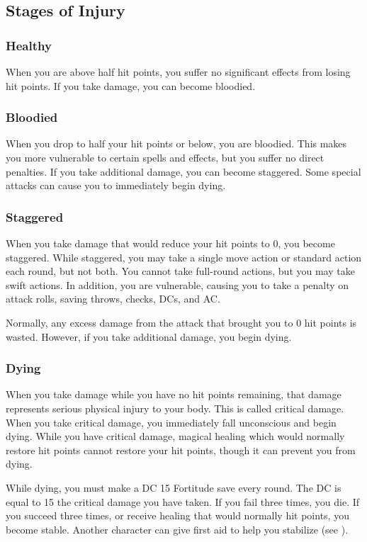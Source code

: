 \subsection{Stages of Injury}

\subsubsection{Healthy} 
When you are above half hit points, you suffer no significant effects from losing hit points. If you take damage, you can become bloodied.

\subsubsection{Bloodied}
When you drop to half your hit points or below, you are bloodied. This makes you more vulnerable to certain spells and effects, but you suffer no direct penalties. If you take additional damage, you can become staggered. Some special attacks can cause you to immediately begin dying.

\subsubsection{Staggered}
When you take damage that would reduce your hit points to 0, you become staggered.  While staggered, you may take a single move action or standard action each round, but not both. You cannot take full-round actions, but you may take swift actions. In addition, you are vulnerable, causing you to take a  penalty on attack rolls, saving throws, checks, DCs, and AC.

Normally, any excess damage from the attack that brought you to 0 hit points is wasted. However, if you take additional damage, you begin dying.

\subsubsection{Dying}
When you take damage while you have no hit points remaining, that damage represents serious physical injury to your body. This is called critical damage. When you take critical damage, you immediately fall unconscious and begin dying. While you have critical damage, magical healing which would normally restore hit points cannot restore your hit points, though it can prevent you from dying.

While dying, you must make a DC 15 Fortitude save every round. The DC is equal to 15 \add the critical damage you have taken. If you fail three times, you die. If you succeed three times, or receive healing that would normally hit points, you become stable. Another character can give first aid to help you stabilize (see ).

